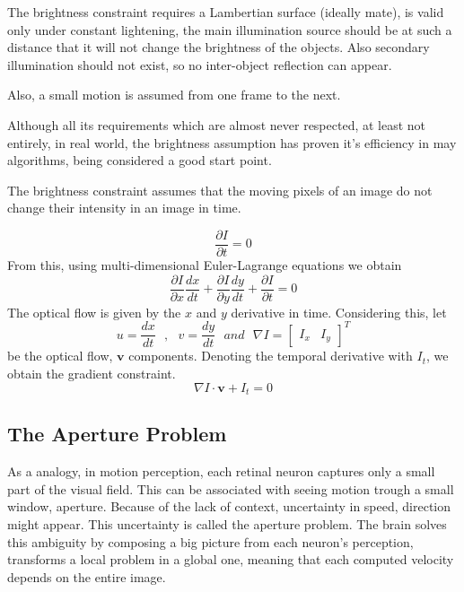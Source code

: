 \documentclass[12pt,a4paper,twoside]{report}
\begin{document}
{The brightness constraint requires a Lambertian surface (ideally mate), is valid only under constant lightening, the main illumination source should be at such a distance that it will not change the brightness of the objects. Also secondary illumination should not exist, so no inter-object reflection can appear.

 Also, a small motion is assumed from one frame to the next. 
 
Although all its  requirements which are almost never respected, at least not entirely, in real world, the brightness assumption has proven it's efficiency in may algorithms, being considered a good start point.

The brightness constraint assumes that the moving pixels of an image do not change their intensity in an image in time.


\begin{equation}  \label{Idt0}
\frac{\partial I}{\partial t} = 0
\end{equation}
From this, using multi-dimensional Euler-Lagrange equations we obtain
\begin{equation} \label{Idt0_lagr}
\frac{\partial I}{\partial x}\frac{dx}{dt} +
\frac{\partial I}{\partial y}\frac{dy}{dt} +
\frac{\partial I}{\partial t} = 0
\end{equation}
The optical flow is given by the $x$ and $y$ derivative in time. Considering this, let
\begin{equation}
u = \frac{dx}{dt} \ \ \ , \ \ \  v = \frac{dy}{dt} \ \ \ and \ \ \ \nabla I=\begin{bmatrix}
I_x & I_y
\end{bmatrix} ^T
\end{equation} 
be the optical flow, $\boldsymbol{v}$ components. Denoting the temporal derivative with $I_t$, we obtain the gradient constraint. 
\begin{equation}
	\nabla I \cdot \boldsymbol{v}+I_t = 0
\end{equation}


\subsection{The Aperture Problem}
As a analogy, in motion perception, each retinal neuron captures only a small part of the visual field. This can be associated with seeing motion trough a small window, aperture. Because of the lack of context, uncertainty in speed, direction might appear. This uncertainty is called the aperture problem.
The brain solves this ambiguity by composing a big picture from each neuron's perception, transforms a local problem in a global one, meaning that each computed velocity depends on the entire image.
 
}
\end{document}
